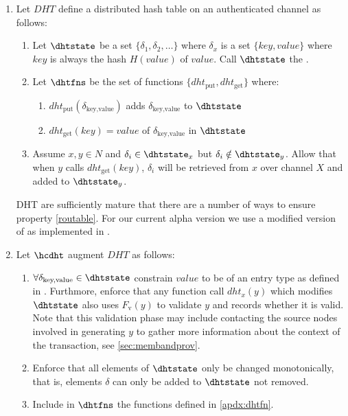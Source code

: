 \documentclass[twocolumn,showpacs,%
  nofootinbib,aps,superscriptaddress,%
  eqsecnum,prd,notitlepage,showkeys,10pt]{revtex4-1}
\begin{document}
\begin{enumerate}
\item Let $DHT$ define a distributed hash table on an authenticated channel as follows:
\begin{enumerate}

\item Let $\dhtstate$ be a set $\{\delta_1,\delta_2,\dots\}$ where $\delta_x$ is a set $\{key,value\}$ where $key$ is always the hash $H(value)$ of $value$.  Call $\dhtstate$ the .
\item Let $\dhtfns$ be the set of functions $\{dht_\text{put},dht_\text{get}\}$ where:
\begin{enumerate}
\item $dht_\text{put}(\delta_\text{key,value})$ adds $\delta_\text{key,value}$ to $\dhtstate$
\item $dht_\text{get}(key) = value$ of $\delta_\text{key,value}$ in $\dhtstate$
\end{enumerate}
\item \label{routable} Assume $x,y \in N$ and $\delta_i \in \dhtstate_x$ but $\delta_i \notin \dhtstate_y$. Allow that when $y$ calls $dht_\text{get}(key)$, $\delta_i$ will be retrieved from $x$ over channel $X$ and added to $\dhtstate_y$.
\end{enumerate}
DHT are sufficiently mature that there are a number of ways to ensure property \ref{routable}.  For our current alpha version we use a modified version of \cite{kademlia} as implemented in \cite{libp2p}.

\item Let $\hcdht$ augment $DHT$ as follows:
\begin{enumerate}

\item $\forall \delta_\text{key,value} \in \dhtstate$ constrain $value$ to be of an entry type as defined in \hcdna.  Furthmore, enforce that any function call $dht_x(y)$ which modifies $\dhtstate$ also uses $F_\mathrm{v}(y)$ to validate $y$ and records whether it is valid.  Note that this validation phase may include contacting the source nodes involved in generating $y$ to gather more information about the context of the transaction, see \ref{sec:membandprov}.

\item Enforce that all elements of $\dhtstate$ only be changed monotonically, that is, elements $\delta$ can only be added to $\dhtstate$ not removed.

\item Include in $\dhtfns$ the functions defined in \ref{apdx:dhtfn}.


\end{enumerate}
\end{enumerate}
\end{document}
